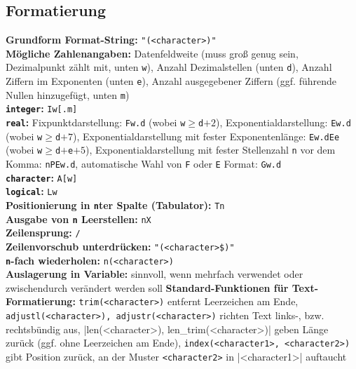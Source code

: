 \documentclass[a4paper, twocolumn]{scrarticle}
\begin{document}
\subsection{Formatierung}
\textbf{Grundform Format-String:} \lstinline|"(<character>)"|\\
\textbf{Mögliche Zahlenangaben:}  Datenfeldweite (muss groß genug sein, Dezimalpunkt zählt mit, unten \lstinline|w|), Anzahl Dezimalstellen (unten \lstinline|d|), Anzahl Ziffern im Exponenten (unten \lstinline|e|), Anzahl ausgegebener Ziffern (ggf. führende Nullen hinzugefügt, unten \lstinline|m|)\\
\textbf{\lstinline|integer|:} \lstinline|Iw[.m]|\\
\textbf{\lstinline|real|:} Fixpunktdarstellung: \lstinline|Fw.d| (wobei \lstinline|w|$\geq$\lstinline|d|$+2$), Exponentialdarstellung: \lstinline|Ew.d| (wobei \lstinline|w|$\geq$\lstinline|d|$+7$), Exponentialdarstellung mit fester Exponentenlänge: \lstinline|Ew.dEe| (wobei \lstinline|w|$\geq$\lstinline|d|$+$\lstinline|e|$+5$), Exponentialdarstellung mit fester Stellenzahl \lstinline|n| vor dem Komma: \lstinline|nPEw.d|, automatische Wahl von \lstinline|F| oder \lstinline|E| Format: \lstinline|Gw.d|\\
\textbf{\lstinline|character|:} \lstinline|A[w]|\\
\textbf{\lstinline|logical|:} \lstinline|Lw|\\
\textbf{Positionierung in \lstinline|n|ter Spalte (Tabulator):} \lstinline|Tn|\\
\textbf{Ausgabe von \lstinline|n| Leerstellen:} \lstinline|nX|\\
\textbf{Zeilensprung:} \lstinline|/|\\
\textbf{Zeilenvorschub unterdrücken:} \lstinline|"(<character>$)"|\\
\textbf{\lstinline|n|-fach wiederholen:} \lstinline|n(<character>)|\\
\textbf{Auslagerung in Variable:} sinnvoll, wenn mehrfach verwendet oder  zwischendurch verändert werden soll
\textbf{Standard-Funktionen für Text-Formatierung:} \lstinline|trim(<character>)| entfernt Leerzeichen am Ende, \lstinline|adjustl(<character>), adjustr(<character>)| richten Text links-, bzw. rechtsbündig aus, \lstlinline|len(<character>), len_trim(<character>)| geben Länge zurück (ggf. ohne Leerzeichen am Ende), \lstinline|index(<character1>, <character2>)| gibt Position zurück, an der Muster \lstinline|<character2>| in \lstinlne|<character1>| auftaucht 
\end{document}
